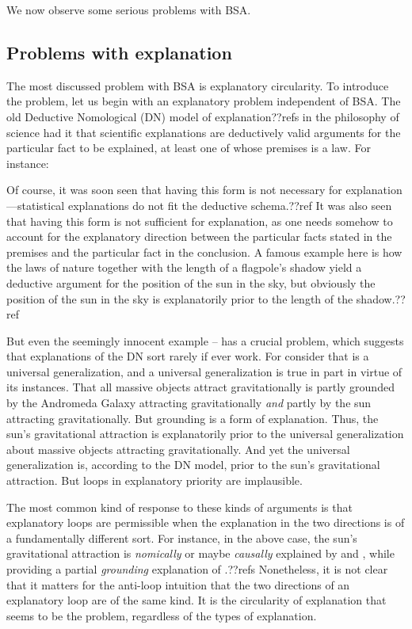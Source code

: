 We now observe some serious problems with BSA.

\subsection{Problems with explanation}\label{sec:law-explanation}
The most discussed problem with BSA is explanatory circularity. To introduce the problem, let us begin with an explanatory 
problem independent of BSA. The old Deductive Nomological (DN) model of explanation??refs in the philosophy of science had it
that scientific explanations are deductively valid arguments for the particular fact to be explained, at least one of whose premises 
is a law. For instance:

Of course, it was soon seen that having this form is not necessary for explanation---statistical explanations do not fit the
deductive schema.??ref It was also seen that having this form is not sufficient for explanation, as one needs somehow to account
for the explanatory direction between the particular facts stated in the premises and the particular fact in the conclusion.
A famous example here is how the laws of nature together with the length of a flagpole's shadow yield a deductive argument
for the position of the sun in the sky, but obviously the position of the sun in the sky is explanatorily prior to the length of
the shadow.??ref

But even the seemingly innocent example -- has a crucial problem, which suggests that
explanations of the DN sort rarely if ever work. For consider that  is a universal generalization, and a universal
generalization is true in part in virtue of its instances. That all massive objects attract gravitationally is partly grounded
by the Andromeda Galaxy attracting gravitationally \textit{and} partly by the sun attracting gravitationally. But grounding is a 
form of explanation. Thus, the sun's gravitational attraction is explanatorily prior to the universal generalization about massive
objects attracting gravitationally. And yet the universal generalization is, according to the DN model, prior to the sun's gravitational
attraction. But loops in explanatory priority are implausible.

The most common kind of response to these kinds of arguments is that explanatory loops are permissible when the explanation in the
two directions is of a fundamentally different sort. For instance, in the above case, the sun's gravitational attraction is 
\textit{nomically} or maybe \textit{causally} explained by  and , while providing a partial \textit{grounding} 
explanation of .??refs Nonetheless, it is not clear that it matters for the anti-loop intuition that the two directions of an 
explanatory loop are of the same kind. It is the circularity of explanation that seems to be the problem, regardless
of the types of explanation.

